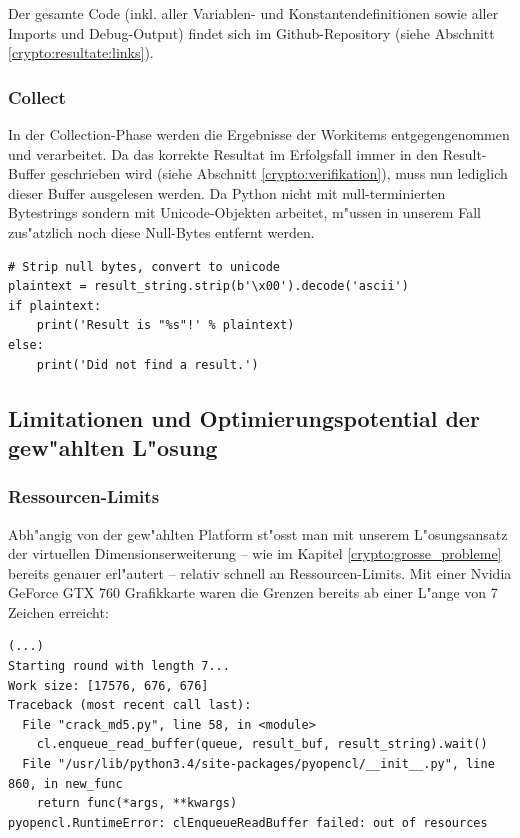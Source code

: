 \begin{refsection}
\noindent Der gesamte Code (inkl. aller Variablen- und Konstantendefinitionen
sowie aller Imports und Debug-Output) findet sich im Github-Repository (siehe
Abschnitt \ref{crypto:resultate:links}).

\subsubsection{Collect}

In der Collection-Phase werden die Ergebnisse der Workitems entgegengenommen und
verarbeitet. Da das korrekte Resultat im Erfolgsfall immer in den Result-Buffer
geschrieben wird (siehe Abschnitt \ref{crypto:verifikation}), muss nun lediglich
dieser Buffer ausgelesen werden. Da Python nicht mit null-terminierten
Bytestrings sondern mit Unicode-Objekten arbeitet, m"ussen in unserem Fall
zus"atzlich noch diese Null-Bytes entfernt werden.

\begin{small}
\begin{verbatim}
# Strip null bytes, convert to unicode
plaintext = result_string.strip(b'\x00').decode('ascii')
if plaintext:
    print('Result is "%s"!' % plaintext)
else:
    print('Did not find a result.')
\end{verbatim}
\end{small}


\subsection{Limitationen und Optimierungspotential der gew"ahlten L"osung}

\subsubsection{Ressourcen-Limits}
\label{crypto:resourcenlimits}

Abh"angig von der gew"ahlten Platform st"osst man mit unserem L"osungsansatz der
virtuellen Dimensionserweiterung -- wie im Kapitel \ref{crypto:grosse_probleme}
bereits genauer erl"autert -- relativ schnell an Ressourcen-Limits. Mit einer
Nvidia GeForce GTX 760 Grafikkarte waren die Grenzen bereits ab einer L"ange von
7 Zeichen erreicht:

\begin{small}
\begin{verbatim}
(...)
Starting round with length 7...
Work size: [17576, 676, 676]
Traceback (most recent call last):
  File "crack_md5.py", line 58, in <module>
    cl.enqueue_read_buffer(queue, result_buf, result_string).wait()
  File "/usr/lib/python3.4/site-packages/pyopencl/__init__.py", line 860, in new_func
    return func(*args, **kwargs)
pyopencl.RuntimeError: clEnqueueReadBuffer failed: out of resources
\end{verbatim}
\end{small}


\end{refsection}
